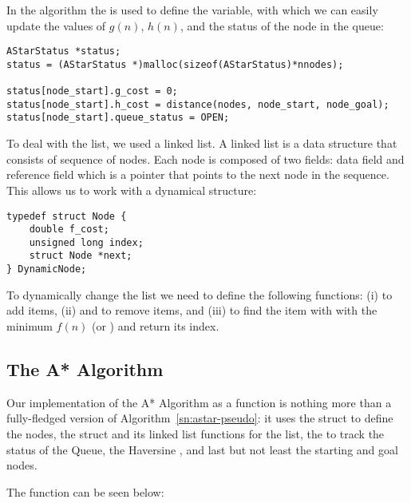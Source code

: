 In the  algorithm the  is used to define the  variable, with which we can easily update the values of $g(n)$, $h(n)$, and the status of the node in the queue:
\begin{lstlisting}
AStarStatus *status;
status = (AStarStatus *)malloc(sizeof(AStarStatus)*nnodes);

status[node_start].g_cost = 0;
status[node_start].h_cost = distance(nodes, node_start, node_goal);
status[node_start].queue_status = OPEN;
\end{lstlisting}

To deal with the  list, we used a linked list. A linked list is a data structure that consists of sequence of nodes. Each node is composed of two fields: data field and reference field which is a pointer that points to the next node in the sequence. This allows us to work with a dynamical  structure:
\begin{lstlisting}
typedef struct Node {
	double f_cost;
	unsigned long index;
	struct Node *next;
} DynamicNode;
\end{lstlisting}

To dynamically change the  list we need to define the following functions: (i)  to add items, (ii)  and  to remove items, and (iii)  to find the item with with the minimum $f(n)$ (or ) and return its index.
\nocite{CLinkedList}

\subsection{The A* Algorithm}

Our implementation of the A* Algorithm as a function is nothing more than a fully-fledged version of Algorithm~\ref{sn:astar-pseudo}: it uses the  struct to define the nodes, the  struct and its linked list functions for the  list, the  to track the status of the Queue, the Haversine , and last but not least the starting and goal nodes.

The  function can be seen below:

